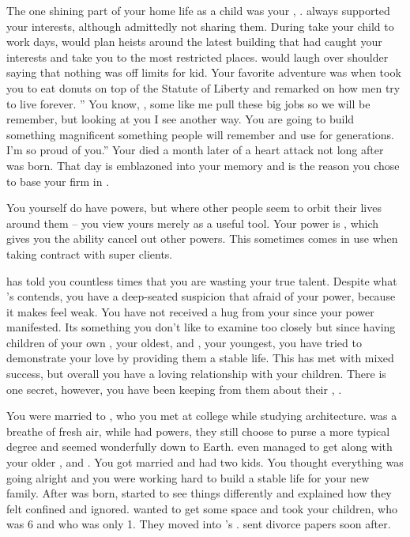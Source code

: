 \documentclass[char]{LRSguildcamp1}
\begin{document}
The one shining part of your home life as a child was your \cGS{\parent}, \cGS{}. \cGS{} always supported your interests, although admittedly not sharing them. During take your child to work days, \cGS{} would plan \cGS{\their} heists around the latest building that had caught your interests and take you to the most restricted places. \cGS{} would laugh over \cGS{\their} shoulder saying that nothing was off limits for \cGS{\their} kid. Your favorite adventure was when \cGS{\they} took you to eat donuts on top of the Statute of Liberty and remarked on how men try to live forever.  '' You know, \cArchitect{}, some \cGS{\humans} like me pull these big jobs so we will be remember, but looking at you I see another way. You are going to build something magnificent something people will remember and use for generations. I'm so proud of you.'' Your \cGS{\parent} died a month later of a heart attack not long after \cYoungest{} was born. That day is emblazoned into your memory and is the reason you chose to base your firm in \pCityArchitect{}.

You yourself do have powers, but where other people seem to orbit their lives around them -- you view yours merely as a useful tool. Your power is \cArchitect{\MYsuperpower}, which gives you the ability cancel out other powers. This sometimes comes in use when taking contract with super clients. 

\cGrandma{} has told you countless times that you are wasting your true talent. Despite what \cGrandma{}'s contends, you have a deep-seated suspicion that \cGrandma{\theyare} afraid of your power, because it makes \cGrandma{\them} feel weak. You have not received a hug from your \cGrandma{\parent} since your power manifested. Its something you don't like to examine too closely but since having children of your own \cTeen{}, your oldest, and \cTween{}, your youngest, you have tried to demonstrate your love by providing them a stable life. This has met with mixed success, but overall you have a loving relationship with your children.  There is one secret, however, you have been keeping from them about their \cAS{\parent}, \cAS{}.

You were married to \cAS{}, who you met at college while studying architecture. \cAS{} was a breathe of fresh air, while \cAS{\they} had powers, they still choose to purse a more typical degree and seemed wonderfully down to Earth. \cAS{} even managed to get along with your older \cOldest{\sibling}, \cOldest{} and \cOldest{\their} \cOS{\spouse} \cOS{}. You got married and had two kids. You thought everything was going alright and you were working hard to build a stable life for your new family. After \cTween{} was born, \cAS{} started to see things differently and \cAS{\they} explained how they felt confined and ignored. \cAS{\they} wanted to get some space and \cAS{} took your children, \cTeen{} who was 6 and \cTween{} who was only 1. They moved into \cOldest{}'s \pCityO{}. \cAS{} sent divorce papers soon after.
\end{document}

